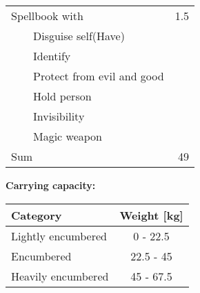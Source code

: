\documentclass[11pt]{article}
\newcommand{\tabitem}{~~\llap{--}~~}
\begin{document}
	\begin{tabularx}{\textwidth}{X|r}
Spellbook with								& 1.5	\\
\tabitem Disguise self(Have)				&		\\
\tabitem Identify							&       \\
\tabitem Protect from evil and good			&		\\
\tabitem Hold person						&		\\
\tabitem Invisibility						&		\\
\tabitem Magic weapon						&		\\
\hline
Sum 										& 49
	\end{tabularx}

\vspace{15mm}

\textbf{Carrying capacity:} \\

	\begin{tabular}{l|c}
Category & Weight [kg] \\
\hline
Lightly encumbered 	& 0 - 22.5 	\\
Encumbered 			& 22.5 - 45 \\
Heavily encumbered	& 45 - 67.5
	\end{tabular}
\end{document}
